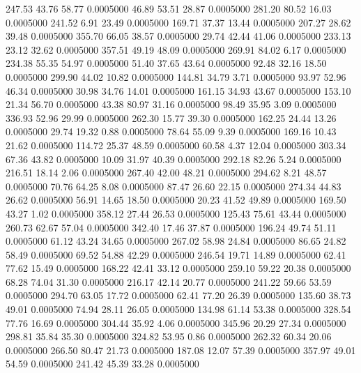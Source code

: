  247.53   43.76   58.77   0.0005000
  46.89   53.51   28.87   0.0005000
 281.20   80.52   16.03   0.0005000
 241.52    6.91   23.49   0.0005000
 169.71   37.37   13.44   0.0005000
 207.27   28.62   39.48   0.0005000
 355.70   66.05   38.57   0.0005000
  29.74   42.44   41.06   0.0005000
 233.13   23.12   32.62   0.0005000
 357.51   49.19   48.09   0.0005000
 269.91   84.02    6.17   0.0005000
 234.38   55.35   54.97   0.0005000
  51.40   37.65   43.64   0.0005000
  92.48   32.16   18.50   0.0005000
 299.90   44.02   10.82   0.0005000
 144.81   34.79    3.71   0.0005000
  93.97   52.96   46.34   0.0005000
  30.98   34.76   14.01   0.0005000
 161.15   34.93   43.67   0.0005000
 153.10   21.34   56.70   0.0005000
  43.38   80.97   31.16   0.0005000
  98.49   35.95    3.09   0.0005000
 336.93   52.96   29.99   0.0005000
 262.30   15.77   39.30   0.0005000
 162.25   24.44   13.26   0.0005000
  29.74   19.32    0.88   0.0005000
  78.64   55.09    9.39   0.0005000
 169.16   10.43   21.62   0.0005000
 114.72   25.37   48.59   0.0005000
  60.58    4.37   12.04   0.0005000
 303.34   67.36   43.82   0.0005000
  10.09   31.97   40.39   0.0005000
 292.18   82.26    5.24   0.0005000
 216.51   18.14    2.06   0.0005000
 267.40   42.00   48.21   0.0005000
 294.62    8.21   48.57   0.0005000
  70.76   64.25    8.08   0.0005000
  87.47   26.60   22.15   0.0005000
 274.34   44.83   26.62   0.0005000
  56.91   14.65   18.50   0.0005000
  20.23   41.52   49.89   0.0005000
 169.50   43.27    1.02   0.0005000
 358.12   27.44   26.53   0.0005000
 125.43   75.61   43.44   0.0005000
 260.73   62.67   57.04   0.0005000
 342.40   17.46   37.87   0.0005000
 196.24   49.74   51.11   0.0005000
  61.12   43.24   34.65   0.0005000
 267.02   58.98   24.84   0.0005000
  86.65   24.82   58.49   0.0005000
  69.52   54.88   42.29   0.0005000
 246.54   19.71   14.89   0.0005000
  62.41   77.62   15.49   0.0005000
 168.22   42.41   33.12   0.0005000
 259.10   59.22   20.38   0.0005000
  68.28   74.04   31.30   0.0005000
 216.17   42.14   20.77   0.0005000
 241.22   59.66   53.59   0.0005000
 294.70   63.05   17.72   0.0005000
  62.41   77.20   26.39   0.0005000
 135.60   38.73   49.01   0.0005000
  74.94   28.11   26.05   0.0005000
 134.98   61.14   53.38   0.0005000
 328.54   77.76   16.69   0.0005000
 304.44   35.92    4.06   0.0005000
 345.96   20.29   27.34   0.0005000
 298.81   35.84   35.30   0.0005000
 324.82   53.95    0.86   0.0005000
 262.32   60.34   20.06   0.0005000
 266.50   80.47   21.73   0.0005000
 187.08   12.07   57.39   0.0005000
 357.97   49.01   54.59   0.0005000
 241.42   45.39   33.28   0.0005000

